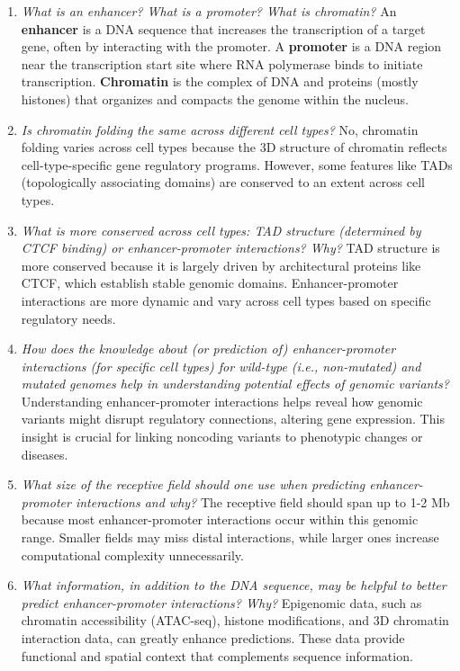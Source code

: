 \documentclass[a4paper]{article}
\begin{document}
\begin{enumerate}
    \item \textit{What is an enhancer? What is a promoter? What is chromatin?}  
    An \textbf{enhancer} is a DNA sequence that increases the transcription of a target gene, often by interacting with the promoter.  
    A \textbf{promoter} is a DNA region near the transcription start site where RNA polymerase binds to initiate transcription.  
    \textbf{Chromatin} is the complex of DNA and proteins (mostly histones) that organizes and compacts the genome within the nucleus.  

    \item \textit{Is chromatin folding the same across different cell types?}  
    No, chromatin folding varies across cell types because the 3D structure of chromatin reflects cell-type-specific gene regulatory programs.  
    However, some features like TADs (topologically associating domains) are conserved to an extent across cell types.  

    \item \textit{What is more conserved across cell types: TAD structure (determined by CTCF binding) or enhancer-promoter interactions? Why?}  
    TAD structure is more conserved because it is largely driven by architectural proteins like CTCF, which establish stable genomic domains.  
    Enhancer-promoter interactions are more dynamic and vary across cell types based on specific regulatory needs.  

    \item \textit{How does the knowledge about (or prediction of) enhancer-promoter interactions (for specific cell types) for wild-type (i.e., non-mutated) and mutated genomes help in understanding potential effects of genomic variants?}  
    Understanding enhancer-promoter interactions helps reveal how genomic variants might disrupt regulatory connections, altering gene expression.  
    This insight is crucial for linking noncoding variants to phenotypic changes or diseases.  

    \item \textit{What size of the receptive field should one use when predicting enhancer-promoter interactions and why?}  
    The receptive field should span up to 1-2 Mb because most enhancer-promoter interactions occur within this genomic range.  
    Smaller fields may miss distal interactions, while larger ones increase computational complexity unnecessarily.  

    \item \textit{What information, in addition to the DNA sequence, may be helpful to better predict enhancer-promoter interactions? Why?}  
    Epigenomic data, such as chromatin accessibility (ATAC-seq), histone modifications, and 3D chromatin interaction data, can greatly enhance predictions.  
    These data provide functional and spatial context that complements sequence information.  


\end{enumerate}
\end{document}
